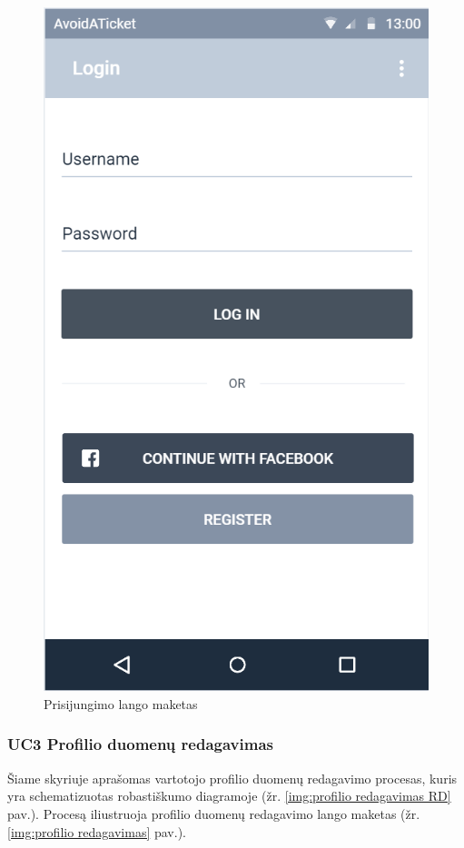 \documentclass{VUMIFPSkursinis}
\begin{document}
	\begin{figure}[H]
				\centering
				\includegraphics[scale=0.3]{img/mockup_login}
				\caption{Prisijungimo lango maketas}
				\label{img:prisijungimas}
			\end{figure}

\subsubsection{UC3 Profilio duomenų redagavimas}
	Šiame skyriuje aprašomas vartotojo profilio duomenų redagavimo procesas, kuris yra schematizuotas robastiškumo diagramoje (žr. \ref{img:profilio redagavimas RD} pav.). 
	Procesą iliustruoja profilio duomenų redagavimo lango maketas (žr. \ref{img:profilio redagavimas} pav.).
\end{document}
